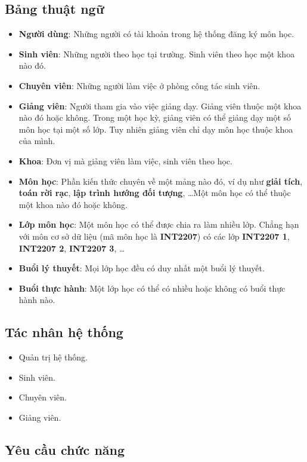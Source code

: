 \documentclass[12pt]{article}
\begin{document}
  \subsection{Bảng thuật ngữ}
    \begin{itemize}
      \item \textbf{Người dùng}: Những người có tài khoản trong hệ thống đăng ký môn học.
      \item \textbf{Sinh viên}: Những người theo học tại trường. Sinh viên theo học một khoa nào đó.
      \item \textbf{Chuyên viên}: Những người làm việc ở phòng công tác sinh viên.
      \item \textbf{Giảng viên}: Người tham gia vào việc giảng dạy. Giảng viên thuộc một khoa nào đó hoặc không. Trong một học kỳ, giảng viên có thể giảng dạy một số môn học tại một số lớp. Tuy nhiên giảng viên chỉ dạy môn học thuộc khoa của mình.
      \item \textbf{Khoa}: Đơn vị mà giảng viên làm việc, sinh viên theo học.
      \item \textbf{Môn học}: Phần kiến thức chuyên về một mảng nào đó, ví dụ như \textbf{giải tích}, \textbf{toán rời rạc}, \textbf{lập trình hướng đối tượng}, \ldots Một môn học có thể thuộc một khoa nào đó hoặc không.
      \item \textbf{Lớp môn học}: Một môn học có thể được chia ra làm nhiều lớp. Chẳng hạn với môn cơ sở dữ liệu (mã môn học là \textbf{INT2207}) có các lớp \textbf{INT2207 1}, \textbf{INT2207 2}, \textbf{INT2207 3}, \ldots
      \item \textbf{Buổi lý thuyết}: Mọi lớp học đều có duy nhất một buổi lý thuyết.
      \item \textbf{Buổi thực hành}: Một lớp học có thể có nhiều hoặc không có buổi thực hành nào.
    \end{itemize}
  
  \subsection{Tác nhân hệ thống}
    \begin{itemize}
      \item Quản trị hệ thống.
      \item Sinh viên.
      \item Chuyên viên.
      \item Giảng viên.
    \end{itemize}
  
  \subsection{Yêu cầu chức năng}
\end{document}
